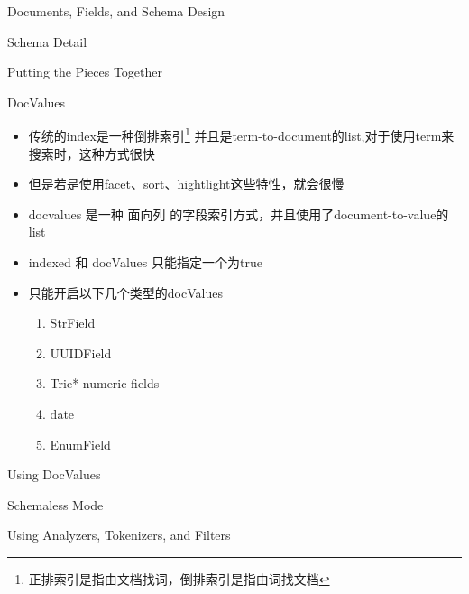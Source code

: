 \documentclass[presentation]{beamer}
\begin{document}
\begin{frame}[fragile,label={sec:orgc0e77e6}]{Documents, Fields, and Schema Design}
\begin{block}{Schema Detail}
\begin{block}{Putting the Pieces Together}
\begin{block}{DocValues}
\begin{itemize}
\item 传统的index是一种倒排索引\footnote{正排索引是指由文档找词，倒排索引是指由词找文档} 并且是term-to-document的list,对于使用term来搜索时，这种方式很快
\item 但是若是使用facet、sort、hightlight这些特性，就会很慢
\item docvalues 是一种 面向列 的字段索引方式，并且使用了document-to-value的list
\item indexed 和 docValues 只能指定一个为true
\item 只能开启以下几个类型的docValues
\begin{enumerate}
\item StrField
\item UUIDField
\item Trie* numeric fields
\item date
\item EnumField
\end{enumerate}
\end{itemize}
\end{block}

\begin{block}{Using DocValues}
\end{block}

\begin{block}{Schemaless Mode}
\end{block}
\end{block}
\end{block}
\end{frame}
\begin{frame}[label={sec:orgb79ac70}]{Using Analyzers, Tokenizers, and Filters}
\begin{block}{}
\end{block}
\end{frame}
\end{document}
